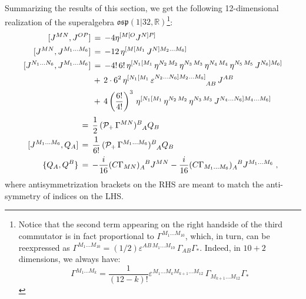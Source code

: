 \documentclass[a4paper,11pt]{article}
\begin{document}
Summarizing the results of this section, we get the following
12-dimensional realization of the superalgebra
$\mathfrak{osp}(1|32,\mathbb{R})$\footnote{Notice that the second term appearing on the right handside of the
third commutator is in fact proportional to $\Gamma^{M_1\ldots
M_{10}}$, which, in turn, can be reexpressed as 
$\Gamma^{M_1\ldots M_{10}}=(1/2)\varepsilon^{AB\,M_1\ldots
M_{10}}\,\Gamma_{AB} \Gamma_*$. Indeed, in $10+2$ dimensions, we
always have:
\begin{equation*}\label{eps}
\Gamma^{M_1\ldots M_{k}}=\frac{1}{(12-k)!}\varepsilon^{M_1\ldots
M_{k} M_{k+1} \ldots M_{12}}\,\Gamma_{M_{k+1} \ldots M_{12}} \Gamma_*
\end{equation*}}:
\begin{align}\label{algebra}
[J^{MN},J^{OP}] &\,=\, -4 \eta^{[M [O} J^{N] P]} \notag\\
[J^{MN},J^{M_1\ldots M_6}] &\,=\,-12\,\eta^{[M[M_1}\,J^{N]M_2\ldots M_6]} \notag\\ 
[J^{N_1\ldots N_6},J^{M_1\ldots M_6}] 
&\,=\,-4!\,6!\,\eta^{[N_1[M_1}\,\eta^{N_2\,M_2}\,\eta^{N_3\,M_3}\,\eta^{N_4\,M_4}\,\eta^{N_5\,M_5}\,J^{N_6]M_6]} \notag\\
&\,+\,2\cdot 6^2\,
\eta^{[N_1[M_1}\,\varepsilon^{N_2\ldots N_6]M_2\ldots M_6]}_{\phantom{N_2\ldots N_6]M_2\ldots M_6]}AB}\,J^{AB}\notag\\
&\,+\,4\left(\frac{6!}{4!}\right)^3\,\eta^{[N_1[M_1}\,\eta^{N_2\,M_2}\,\eta^{N_3\,M_3}\,J^{N_4\ldots N_6]M_4\ldots M_6]}
\end{align}
\begin{align*}
[J^{MN},Q_A]\,&=\,\frac{1}{2}\, ({\cal P_+}\,\Gamma^{MN})^B_{\phantom{B}A} Q_B\\
[J^{M_1\ldots M_6},Q_A]\,&=\,\frac{1}{6!}\,({\cal P_+}\,\Gamma^{M_1\ldots M_6})^B_{\phantom{B}A} Q_B\\
\{Q_A,Q^B\} \,&=\, -\frac{i}{16} (C \Gamma_{MN})_A^{\phantom{A}B} J^{MN}
- \frac{i}{16} (C \Gamma_{M_1\ldots M_6})_A^{\phantom{A}B}
J^{M_1\ldots M_6}\;, 
\end{align*}
where antisymmetrization brackets on the RHS are meant to match the anti-symmetry of indices on the LHS.
\end{document}
